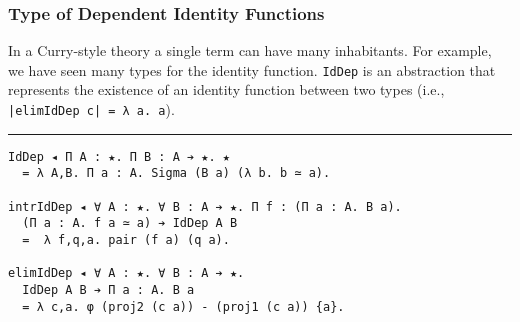 \documentclass[mathserif,usenames,dvipsnames]{beamer}
\begin{document}





\begin{frame}[fragile]
\frametitle{Type of Dependent Identity Functions}

In a Curry-style theory a single term can have many inhabitants. For
example, we have seen many types for the identity function.
\texttt{IdDep} is an abstraction that represents
the existence of an identity function between two types
(i.e., \texttt{|elimIdDep c| = λ a. a}).

\noindent\rule{\textwidth}{1pt}

\begin{verbatim}
IdDep ◂ Π A : ★. Π B : A ➔ ★. ★
  = λ A,B. Π a : A. Sigma (B a) (λ b. b ≃ a).

intrIdDep ◂ ∀ A : ★. ∀ B : A ➔ ★. Π f : (Π a : A. B a). 
  (Π a : A. f a ≃ a) ➔ IdDep A B 
  =  λ f,q,a. pair (f a) (q a).

elimIdDep ◂ ∀ A : ★. ∀ B : A ➔ ★. 
  IdDep A B ➔ Π a : A. B a
  = λ c,a. φ (proj2 (c a)) - (proj1 (c a)) {a}.
\end{verbatim}

\end{frame}
\end{document}
